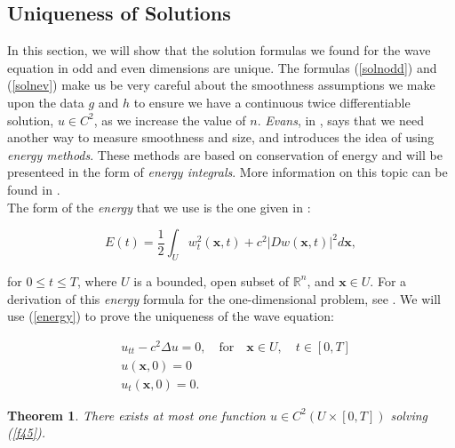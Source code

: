 \documentclass[a4paper, 12pt]{article}
\numberwithin{equation}{section}
\begin{document}
\subsection{Uniqueness of Solutions}
In this section, we will show that the solution formulas we found for the wave
equation in odd and even dimensions are unique. The formulas (\ref{solnodd}) and
(\ref{solnev}) make us be very careful about the smoothness assumptions we make
upon the data $g$ and $h$ to ensure we have a continuous twice differentiable
solution, $u \in C^2$, as we increase the value of $n$. \emph{Evans}, in
\cite{Ev}, says that we need another way to measure smoothness and size, and
introduces the idea of using \emph{energy methods}. These methods are based on
conservation of energy and will be presenteed in the form of \emph{energy
integrals}. More information on this topic can be found in \cite[Chapter VI,
Section 6]{Hil}. \\

The form of the \emph{energy} that we use is the one given in \cite{Ev}:

\begin{equation} \label{energy}
    E(t)=\frac{1}{2}\int_U w_t^2(\boldsymbol{x}, t)+c^2|Dw(\boldsymbol{x}, t)|^2d\boldsymbol{x},
\end{equation}

for $0 \le t \le T$, where $U$ is a bounded, open subset of $\mathbb{R}^n$, and
$\boldsymbol{x} \in U$. For a derivation of this \emph{energy} formula for the
one-dimensional problem, see \cite[Section 3.6.4]{Kev}. We will use
(\ref{energy}) to prove the uniqueness of the wave equation:

\begin{equation} \label{f45}
    \begin{aligned}
        &u_{tt}-c^2\Delta u =0, \quad \textrm{for} \quad \boldsymbol{x} \in U, \quad t \in [0,T]\\
        &u(\boldsymbol{x}, 0)=0\\
        &u_t(\boldsymbol{x}, 0)=0.
    \end{aligned}
\end{equation}

\newtheorem*{theorem}{Theorem}
\begin{theorem}
    There exists at most one function $u \in C^2(U \times [0,T])$ solving
    (\ref{f45}).
\end{theorem}
\end{document}
